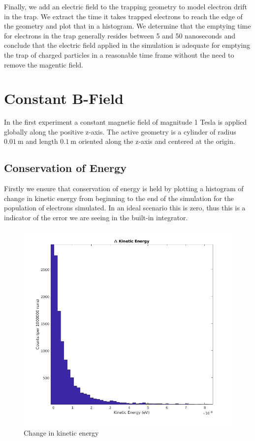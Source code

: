 \documentclass[12pt,letterpaper]{article}
\begin{document}
Finally, we add an electric field to the trapping geometry to model electron drift in the trap. We extract the time it takes trapped electrons to reach the edge of the geometry and plot that in a histogram. We determine that the emptying time for electrons in the trap generally resides between 5 and 50 nanoseconds and conclude that the electric field applied in the simulation is adequate for emptying the trap of charged particles in a reasonable time frame without the need to remove the magentic field. 

\section{Constant B-Field}

In the first experiment a constant magnetic field of magnitude 1 Tesla is applied globally along the positive z-axis. The active geometry is a cylinder of radius $0.01~$m and length $0.1~$m oriented along the z-axis and centered at the origin.

\subsection{Conservation of Energy}

Firstly we ensure that conservation of energy is held by plotting a histogram of change in kinetic energy from beginning to the end of the simulation for the population of electrons simulated. In an ideal scenario this is zero, thus this is a indicator of the error we are seeing in the built-in integrator. 

    \begin{figure}[H]
    \centering
    \includegraphics[width=0.7\linewidth]{img/ke.png}
    \caption{Change in kinetic energy}
    \end{figure}
    
\end{document}
